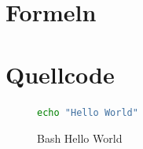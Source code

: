 \section{Formeln}

\section{Quellcode}
\begin{figure}
\begin{lstlisting}[language=bash]
echo "Hello World"
\end{lstlisting}
\caption{Bash Hello World}
\end{figure}

